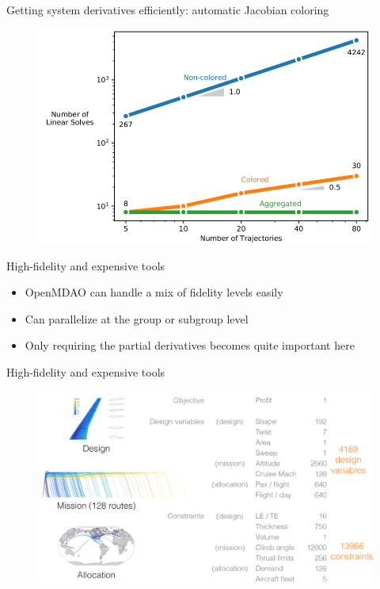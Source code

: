 \documentclass[aspectratio=169, usenames,dvipsnames, 14pt]{beamer}
\begin{document}
\begin{frame}{Getting system derivatives efficiently: automatic Jacobian coloring}
	\begin{figure}
		\includegraphics[scale=0.45]{images/slide_121.png}
	\end{figure}
\end{frame}

\begin{frame}{High-fidelity and expensive tools}
	\begin{itemize}
		\item OpenMDAO can handle a mix of fidelity levels easily
		\item Can parallelize at the group or subgroup level
		\item Only requiring the partial derivatives becomes quite important here
	\end{itemize}
\end{frame}

\begin{frame}{High-fidelity and expensive tools}
	\begin{figure}
		\includegraphics[scale=0.4]{images/slide_123.png}
	\end{figure}
\end{frame}
			
\end{document}
